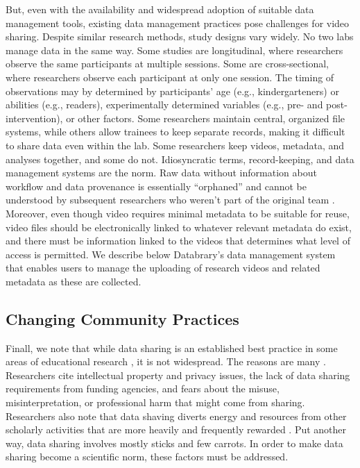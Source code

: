 \documentclass[letterpaper,man,apacite]{apa6}
\begin{document}
But, even with the availability and widespread adoption of suitable data management tools, existing data management practices pose challenges for video sharing.
Despite similar research methods, study designs vary widely. 
No two labs manage data in the same way. 
Some studies are longitudinal, where researchers observe the same participants at multiple sessions. 
Some are cross-sectional, where researchers observe each participant at only one session. 
The timing of observations may by determined by participants’ age (e.g., kindergarteners) or abilities (e.g., readers), experimentally determined variables (e.g., pre- and post-intervention), or other factors. 
Some researchers maintain central, organized file systems, while others allow trainees to keep separate records, making it difficult to share data even within the lab. 
Some researchers keep videos, metadata, and analyses together, and some do not. 
Idiosyncratic terms, record-keeping, and data management systems are the norm. 
Raw data without information about workflow and data provenance is essentially “orphaned” and cannot be understood by subsequent researchers who weren’t part of the original team \cite{curry2011}. 
Moreover, even though video requires minimal metadata to be suitable for reuse, video files should be electronically linked to whatever relevant metadata do exist, and there must be information linked to the videos that determines what level of access is permitted. 
We describe below Databrary's data management system that enables users to manage the uploading of research videos and related metadata as these are collected.

\subsection{Changing Community Practices}

Finall, we note that while data sharing is an established best practice in some areas of educational research \cite{AERA-Code-2011}, it is not widespread.
The reasons are many \cite{Ascoli2006b,Ferguson2014}.
Researchers cite intellectual property and privacy issues, the lack of data sharing requirements from funding agencies, and fears about the misuse, misinterpretation, or professional harm that might come from sharing.
Researchers also note that data shaving diverts energy and resources from other scholarly activities that are more heavily and frequently rewarded \cite{Ascoli2006b,Ferguson2014}.
Put another way, data sharing involves mostly sticks and few carrots.
In order to make data sharing become a scientific norm, these factors must be addressed.
\end{document}

